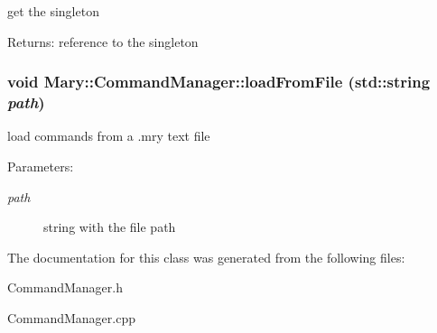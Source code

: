 get the singleton \begin{Desc}
\item[Returns:]reference to the singleton \end{Desc}
\hypertarget{class_mary_1_1_command_manager_4cf3ce59ba3b7be4b65c1e62b610300e}{
\subsubsection[loadFromFile]{\setlength{\rightskip}{0pt plus 5cm}void Mary::CommandManager::loadFromFile (std::string {\em path})}}
\label{class_mary_1_1_command_manager_4cf3ce59ba3b7be4b65c1e62b610300e}


load commands from a .mry text file \begin{Desc}
\item[Parameters:]
\begin{description}
\item[{\em path}]string with the file path \end{description}
\end{Desc}


The documentation for this class was generated from the following files:\begin{CompactItemize}
\item 
CommandManager.h\item 
CommandManager.cpp\end{CompactItemize}
